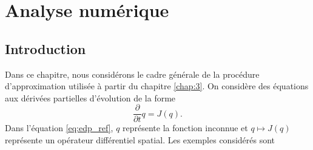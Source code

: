 \chapter{Analyse numérique}
\label{chap:2}

\section{Introduction}

Dans ce chapitre, nous considérons le cadre générale de la procédure d'approximation utilisée à partir du chapitre \ref{chap:3}. On considère des équations aux dérivées partielles d'évolution de la forme
\begin{equation}
\dfrac{\partial}{\partial t}q = J(q).
\label{eq:edp_ref}
\end{equation}
Dans l'équation \eqref{eq:edp_ref}, $q$ représente la fonction inconnue et $q \mapsto J(q)$ représente un opérateur différentiel spatial. Les exemples considérés sont
